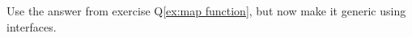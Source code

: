 \begin{Exercise}[title={Map function with interfaces},difficulty=6]
\label{ex:map function interfaces}
\Question
Use the answer from exercise Q\ref{ex:map function}, but now
make it generic using interfaces.
\end{Exercise}

\begin{Answer}
\Question

\end{Answer}


